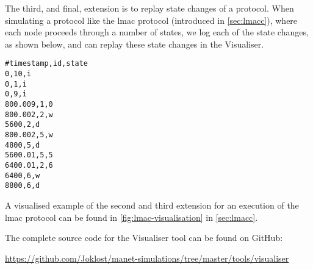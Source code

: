 The third, and final, extension is to replay state changes of a protocol. When simulating a protocol like the
\gls{lmac} protocol (introduced in \autoref{sec:lmacc}), where each node proceeds through a number of states,
we log each of the state changes, as shown below, and can replay these state changes in the Visualiser.
%
\begin{verbatim}
#timestamp,id,state
0,10,i
0,1,i
0,9,i
800.009,1,0
800.002,2,w
5600,2,d
800.002,5,w
4800,5,d
5600.01,5,5
6400.01,2,6
6400,6,w
8800,6,d
\end{verbatim}

A visualised example of the second and third extension for an execution of the \gls{lmac} protocol can be
found in \autoref{fig:lmac-visualisation} in \autoref{sec:lmacc}. \medbreak


The complete source code for the Visualiser tool can be found on GitHub:

{\small \url{https://github.com/Joklost/manet-simulations/tree/master/tools/visualiser}}
%